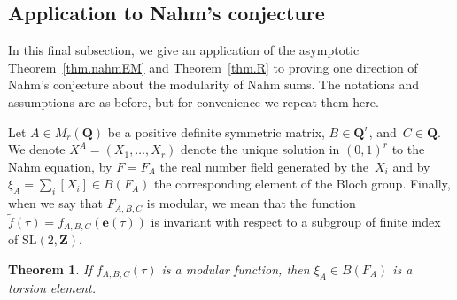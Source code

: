 \documentclass[12pt,reqno]{amsart}
\newtheorem{theorem}{Theorem}[section]
\theoremstyle{definition}
\def\Q{\mathbf Q}   %
\def\Z{\mathbf Z}   %
\def\tf{\widetilde f}
\def\SL{\mathrm{SL}}
\def\diag{\mathrm{diag}}
\def\e{\mathbf{e}}
\def\SL{\mathrm{SL}}
\begin{document}
\subsection{Application to Nahm's conjecture}
\label{sub.nahmconj}

In this final subsection, we give an application of the asymptotic 
Theorem~\ref{thm.nahmEM} and Theorem~\ref{thm.R} to proving one
direction of Nahm's conjecture about the modularity of Nahm sums. 
The notations and assumptions are as before, but for convenience
we repeat them here.

Let $A\in M_r(\Q)$ be a positive definite symmetric matrix, $B\in\Q^r$, 
and~$C\in\Q$. %
We denote $X^A=(X_1,\dots,X_r)$ denote the unique solution in $(0,1)^r$ to the 
Nahm equation, by $F=F_A$ the real number field generated by the~$X_i$ and
by $\xi_A =\sum_i [X_i] \in B(F_A)$ the corresponding element of the Bloch 
group. Finally, when we say that $F_{A,B,C}$ is modular, we mean that the 
function $\tf(\tau)=f_{A,B,C}(\e(\tau))$  is invariant with respect to a 
subgroup of finite index of $\SL(2,\Z)$.

\begin{theorem}
\label{thm.nahm}
If $f_{A,B,C}(\tau)$ is a modular function, then 
$\xi_A \in B(F_A)$ is a torsion element.
\end{theorem}
\end{document}
